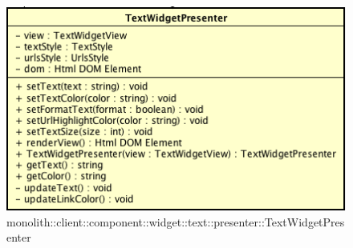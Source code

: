 \label{monolith::client::component::widget::text::presenter::TextWidgetPresenter}
\begin{figure}[H]
	\centering
	\includegraphics[scale=0.5]{Sezioni/SottosezioniST/img/TextWidgetPresenter.png}
	\caption{monolith::client::component::widget::text::presenter::TextWidgetPresenter}
\end{figure}

